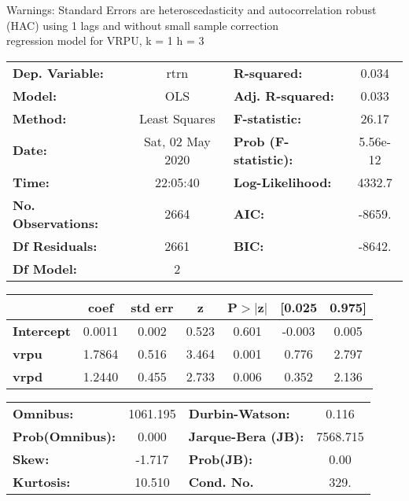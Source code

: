 Warnings: \newline
 [1] Standard Errors are heteroscedasticity and autocorrelation robust (HAC) using 1 lags and without small sample correction\\ 

regression model for VRPU, k = 1 h = 3\begin{center}
\begin{tabular}{lclc}
\toprule
\textbf{Dep. Variable:}    &       rtrn       & \textbf{  R-squared:         } &     0.034   \\
\textbf{Model:}            &       OLS        & \textbf{  Adj. R-squared:    } &     0.033   \\
\textbf{Method:}           &  Least Squares   & \textbf{  F-statistic:       } &     26.17   \\
\textbf{Date:}             & Sat, 02 May 2020 & \textbf{  Prob (F-statistic):} &  5.56e-12   \\
\textbf{Time:}             &     22:05:40     & \textbf{  Log-Likelihood:    } &    4332.7   \\
\textbf{No. Observations:} &        2664      & \textbf{  AIC:               } &    -8659.   \\
\textbf{Df Residuals:}     &        2661      & \textbf{  BIC:               } &    -8642.   \\
\textbf{Df Model:}         &           2      & \textbf{                     } &             \\
\bottomrule
\end{tabular}
\begin{tabular}{lcccccc}
                   & \textbf{coef} & \textbf{std err} & \textbf{z} & \textbf{P$> |$z$|$} & \textbf{[0.025} & \textbf{0.975]}  \\
\midrule
\textbf{Intercept} &       0.0011  &        0.002     &     0.523  &         0.601        &       -0.003    &        0.005     \\
\textbf{vrpu}      &       1.7864  &        0.516     &     3.464  &         0.001        &        0.776    &        2.797     \\
\textbf{vrpd}      &       1.2440  &        0.455     &     2.733  &         0.006        &        0.352    &        2.136     \\
\bottomrule
\end{tabular}
\begin{tabular}{lclc}
\textbf{Omnibus:}       & 1061.195 & \textbf{  Durbin-Watson:     } &    0.116  \\
\textbf{Prob(Omnibus):} &   0.000  & \textbf{  Jarque-Bera (JB):  } & 7568.715  \\
\textbf{Skew:}          &  -1.717  & \textbf{  Prob(JB):          } &     0.00  \\
\textbf{Kurtosis:}      &  10.510  & \textbf{  Cond. No.          } &     329.  \\
\bottomrule
\end{tabular}
\end{center}

